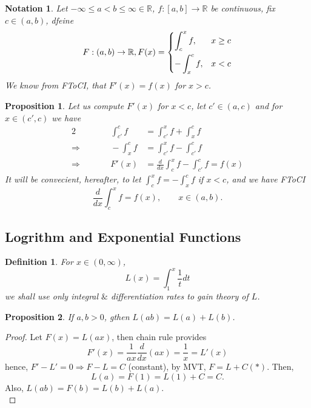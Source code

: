 \documentclass[12pt]{article}
\theoremstyle{plain}
\newtheorem{definition}{Definition}[subsection]
\newtheorem{proposition}{Proposition}[subsection]
\newtheorem{notation}{Notation}[subsection]
\newcommand{\mR}{{\mathbb{R}}}
\begin{document}
	\begin{notation}
		Let $-\infty \leq a < b \leq \infty \in \mR$, $f:[a,b] \to \mR$ be 
		continuous, fix $c \in (a,b)$, dfeine 
		\[
			F:(a,b) \to \mR, F(x) = 
			\begin{dcases}
				\int_c^x f, & x \geq c\\
				-\int_x^c f, & x < c
			\end{dcases}
		\]
		We know from FToCI, that $F'(x) = f(x)$ for $x > c$. \\
	\end{notation}

	\begin{proposition}
		Let us compute $F'(x)$ for $x < c$, let $c'\in (a,c)$ and for $x \in 
		(c',c)$ we have 
		\begin{alignat*}{2}
			& &\qquad \int_{c'}^c f &= \int_{c'}^x f + \int_x^c f \\
			\Rightarrow& &\qquad 
			-\int_x^c f &= \int_{c'}^x f - \int_{c'}^c f \\
			\Rightarrow& &\qquad 
			F'(x) &= \frac{d}{dx} \int_c^x f - \int_{c'}^c f =f(x)
		\end{alignat*}
		It will be convecient, hereafter, to let $\int_c^x f = - \int_x^c f$
		if $x <c$, and we have FToCI
		\[
			\frac d{dx} \int_c^x f = f(x), \qquad x \in (a,b).
		\]
	\end{proposition}
	


	\newpage
	\subsection{Logrithm and Exponential Functions}

	\begin{definition}
		For $x \in (0,\infty)$, 
		\[
			L(x) = \int_1^x \frac 1t dt
		\]
		we shall use only integral $\&$ differentiation rates to gain theory of
		$L$. \\
	\end{definition}
		
	\begin{proposition}
		If $a,b > 0$, gthen $L(ab) = L(a)+L(b)$.
	\end{proposition}
	\begin{proof}
		Let $F(x) = L(ax)$, then chain rule provides 
		\[
			F'(x) = \frac1{ax} \frac d{dx}(ax) = \frac 1x =L'(x)
		\]
		hence, $F' - L' = 0 \Rightarrow F-L=C$ (constant), by MVT, 
		$F = L+C (*)$.
		Then, 
		\[
			L(a) = F(1) = L(1) + C = C. 
		\]
		Also, $L(ab) = F(b) = L(b) + L(a)$. \\
	\end{proof}
\end{document}
